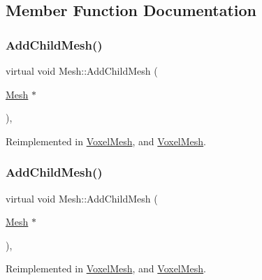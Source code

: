 \subsection{Member Function Documentation}
\mbox{\label{class_mesh_a3f1bcf55b3058829dc7f3dcf260cd231}} 
\subsubsection{\texorpdfstring{AddChildMesh()}{AddChildMesh()}\hspace{0.1cm}{\footnotesize\ttfamily [1/2]}}
{\footnotesize\ttfamily virtual void Mesh\+::\+Add\+Child\+Mesh (\begin{DoxyParamCaption}\item[{\mbox{\hyperlink{class_mesh}{Mesh}} $\ast$}]{ }\end{DoxyParamCaption})\hspace{0.3cm}{\ttfamily [inline]}, {\ttfamily [virtual]}}



Reimplemented in \mbox{\hyperlink{class_voxel_mesh_a08d451f7ec199e9dcab9ab5ee0646b28}{Voxel\+Mesh}}, and \mbox{\hyperlink{class_voxel_mesh_a08d451f7ec199e9dcab9ab5ee0646b28}{Voxel\+Mesh}}.

\mbox{\label{class_mesh_a3f1bcf55b3058829dc7f3dcf260cd231}} 
\subsubsection{\texorpdfstring{AddChildMesh()}{AddChildMesh()}\hspace{0.1cm}{\footnotesize\ttfamily [2/2]}}
{\footnotesize\ttfamily virtual void Mesh\+::\+Add\+Child\+Mesh (\begin{DoxyParamCaption}\item[{\mbox{\hyperlink{class_mesh}{Mesh}} $\ast$}]{ }\end{DoxyParamCaption})\hspace{0.3cm}{\ttfamily [inline]}, {\ttfamily [virtual]}}



Reimplemented in \mbox{\hyperlink{class_voxel_mesh_a08d451f7ec199e9dcab9ab5ee0646b28}{Voxel\+Mesh}}, and \mbox{\hyperlink{class_voxel_mesh_a08d451f7ec199e9dcab9ab5ee0646b28}{Voxel\+Mesh}}.

